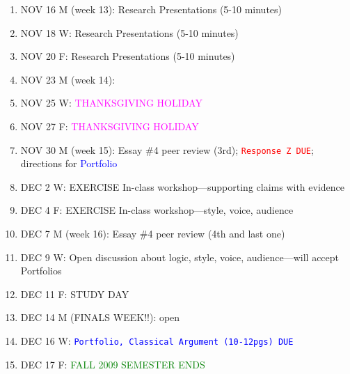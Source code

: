 \documentclass[11pt]{article}
\begin{document}
\begin{enumerate}
\item NOV 16 M (week 13): Research Presentations (5-10 minutes)
\item[] NOV 18 W: Research Presentations (5-10 minutes)
\item[] NOV 20 F: Research Presentations (5-10 minutes)

\item NOV 23 M (week 14):  
\item[] NOV 25 W: \textcolor{magenta}{THANKSGIVING HOLIDAY}
\item[] NOV 27 F: \textcolor{magenta}{THANKSGIVING HOLIDAY}

\item NOV 30 M (week 15): Essay \#4 peer review (3rd); \textcolor{red}{\texttt{Response Z DUE}}; directions for \textcolor{blue}{Portfolio}
\item[] DEC 2 W: EXERCISE In-class workshop---supporting claims with evidence
\item[] DEC 4 F: EXERCISE In-class workshop---style, voice, audience

\item DEC 7 M (week 16): Essay \#4 peer review (4th and last one)
\item[] DEC 9 W:  Open discussion about logic, style, voice, audience---will accept Portfolios
\item[] DEC 11 F: STUDY DAY

\item DEC 14 M (FINALS WEEK!!): open
\item[] DEC 16 W: \textcolor{blue}{\texttt{Portfolio, Classical Argument (10-12pgs) DUE}}
\item[] DEC 17 F: \textcolor{green}{FALL 2009 SEMESTER ENDS}
\end{enumerate}
\end{document}
